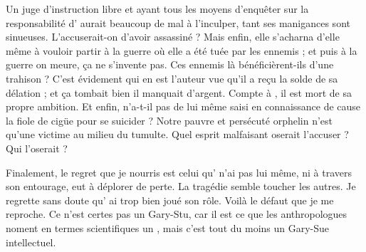 Un juge d’instruction libre et ayant tous les moyens d’enquêter sur la responsabilité d’\elena{} aurait beaucoup de mal à l’inculper, tant ses manigances sont sinueuses. L’accuserait-on d’avoir assassiné \princesse ? Mais enfin, elle s’acharna d’elle même à vouloir partir à la guerre où elle a été tuée par les ennemis ; et puis à la guerre on meure, ça ne s’invente pas. Ces ennemis là bénéficièrent-ils d’une trahison ? C’est évidement \vladimir{} qui en est l’auteur vue qu’il a reçu la solde de sa délation ; et ça tombait bien il manquait d’argent. Compte à \general, il est mort de sa propre ambition. Et enfin, \roi{} n’a-t-il pas de lui même saisi en connaissance de cause la fiole de cigüe pour se suicider ? Notre pauvre et persécuté orphelin \elena{} n’est qu’une victime au milieu du tumulte. Quel esprit malfaisant oserait l’accuser ? Qui l’oserait ?

Finalement, le regret que je nourris est celui qu’\elena{} n’ai pas lui même, ni à travers son entourage, eut à déplorer de perte. La tragédie semble toucher les autres. Je regrette sans doute qu’\elena{} ai trop bien joué son rôle. Voilà le défaut que je me reproche. Ce n’est certes pas un Gary-Stu, car il est ce que les anthropologues noment en termes scientifiques un , mais c’est tout du moins un Gary-Sue intellectuel.


